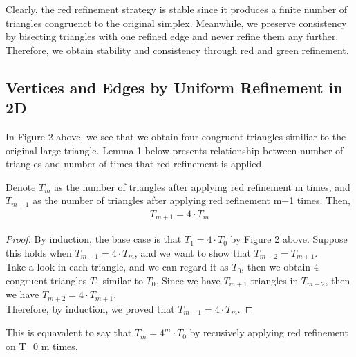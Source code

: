     
    Clearly, the red refinement strategy is stable since it produces a finite number of triangles congruenct to the original simplex. Meanwhile, we preserve consistency by bisecting triangles with one refined edge and never refine them any further. Therefore, we obtain stability and consistency through red and green refinement.

    \subsection{Vertices and Edges by Uniform Refinement in 2D}
    In Figure 2 above, we see that we obtain four congruent triangles similiar to the original large triangle. Lemma 1 below presents relationship between number of triangles and number of times that red refinement is applied.

    \begin{lemma}
    Denote $T_{m}$ as the number of triangles after applying red refinement m times, and $T_{m+1}$ as the number of triangles after applying red refinement m+1 times. Then,
    \begin{align*}
    T_{m+1} = 4 \cdot T_{m}
    \end{align*}
    \end{lemma}
    \begin{proof}
    By induction, the base case is that $T_1 = 4 \cdot T_0$ by Figure 2 above. Suppose this holds when $T_{m+1} = 4\cdot T_{m}$, and we want to show that $T_{m+2} = T_{m+1}$.\\
    Take a look in each triangle, and we can regard it as $T_0$, then we obtain 4 congruent triangles $T_1$ similar to $T_0$. Since we have $T_{m+1}$ triangles in $T_{m+2}$, then we have $T_{m+2} = 4\cdot T_{m+1}$.\\
    Therefore, by induction, we proved that $T_{m+1} = 4 \cdot T_{m}$.
    \end{proof}
    This is equavalent to say that $T_{m} = 4^{m} \cdot T_{0}$ by recusively applying red refinement on T_{0} m times.

